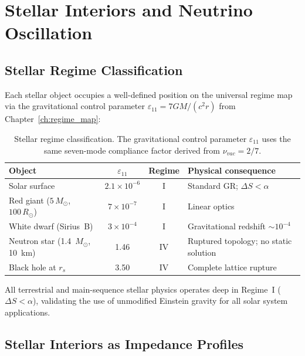 
\chapter{Stellar Interiors and Neutrino Oscillation}
\label{ch:stellar}

\section{Stellar Regime Classification}
\label{sec:stellar_regimes}

Each stellar object occupies a well-defined position on the universal regime map via the gravitational control parameter $\varepsilon_{11} = 7GM/(c^2 r)$ from Chapter~\ref{ch:regime_map}:

\begin{table}[H]
\centering\small
\caption{Stellar regime classification.  The gravitational control parameter $\varepsilon_{11}$ uses the same seven-mode compliance factor derived from $\nu_{vac} = 2/7$.}
\label{tab:stellar_regimes}
\begin{tabular}{lccl}
\toprule
\textbf{Object} & $\varepsilon_{11}$ & \textbf{Regime} & \textbf{Physical consequence} \\
\midrule
Solar surface              & $2.1 \times 10^{-6}$ & I  & Standard GR; $\Delta S < \alpha$ \\
Red giant ($5\,M_\odot$, $100\,R_\odot$) & $7 \times 10^{-7}$ & I  & Linear optics \\
White dwarf (Sirius~B)     & $3 \times 10^{-4}$   & I  & Gravitational redshift $\sim 10^{-4}$ \\
Neutron star (1.4~$M_\odot$, 10~km) & 1.46     & IV & Ruptured topology; no static solution \\
Black hole at $r_s$        & 3.50                  & IV & Complete lattice rupture \\
\bottomrule
\end{tabular}
\end{table}

\noindent All terrestrial and main-sequence stellar physics operates deep in Regime~I ($\Delta S < \alpha$), validating the use of unmodified Einstein gravity for all solar system applications.

\section{Stellar Interiors as Impedance Profiles}
\label{sec:stellar_interior}

